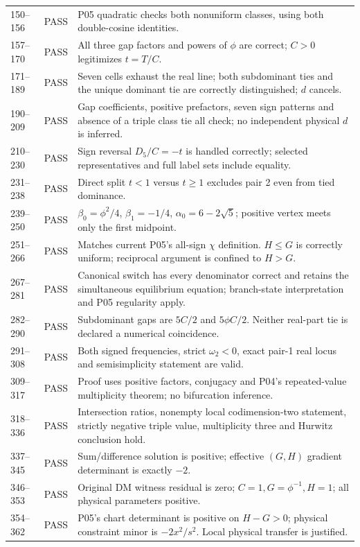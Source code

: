 \documentclass[11pt]{article}
\begin{document}
\begin{longtable}{@{}L{0.11\textwidth}L{0.10\textwidth}L{0.73\textwidth}@{}}
150--156&PASS&P05 quadratic checks both nonuniform classes, using both double-cosine identities.\\
157--170&PASS&All three gap factors and powers of $\phi$ are correct; $C>0$ legitimizes $t=T/C$.\\
171--189&PASS&Seven cells exhaust the real line; both subdominant ties and the unique dominant tie are correctly distinguished; $d$ cancels.\\
190--209&PASS&Gap coefficients, positive prefactors, seven sign patterns and absence of a triple class tie all check; no independent physical $d$ is inferred.\\
210--230&PASS&Sign reversal $D_5/C=-t$ is handled correctly; selected representatives and full label sets include equality.\\
231--238&PASS&Direct split $t<1$ versus $t\ge1$ excludes pair 2 even from tied dominance.\\
239--250&PASS&$\beta_0=\phi^2/4$, $\beta_1=-1/4$, $\alpha_0=6-2\sqrt5$; positive vertex meets only the first midpoint.\\
251--266&PASS&Matches current P05's all-sign $\chi$ definition. $H\le G$ is correctly uniform; reciprocal argument is confined to $H>G$.\\
267--281&PASS&Canonical switch has every denominator correct and retains the simultaneous equilibrium equation; branch-state interpretation and P05 regularity apply.\\
282--290&PASS&Subdominant gaps are $5C/2$ and $5\phi C/2$. Neither real-part tie is declared a numerical coincidence.\\
291--308&PASS&Both signed frequencies, strict $\omega_2<0$, exact pair-1 real locus and semisimplicity statement are valid.\\
309--317&PASS&Proof uses positive factors, conjugacy and P04's repeated-value multiplicity theorem; no bifurcation inference.\\
318--336&PASS&Intersection ratios, nonempty local codimension-two statement, strictly negative triple value, multiplicity three and Hurwitz conclusion hold.\\
337--345&PASS&Sum/difference solution is positive; effective $(G,H)$ gradient determinant is exactly $-2$.\\
346--353&PASS&Original DM witness residual is zero; $C=1,G=\phi^{-1},H=1$; all physical parameters positive.\\
354--362&PASS&P05's chart determinant is positive on $H-G>0$; physical constraint minor is $-2x^2/s^2$. Local physical transfer is justified.\\

\end{longtable}
\end{document}

